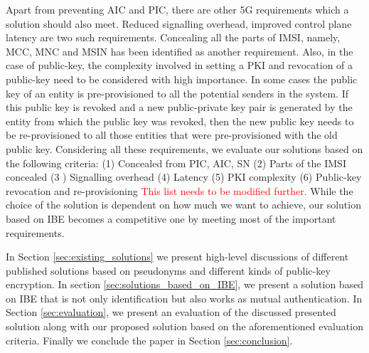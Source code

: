 \documentclass[runningheads,a4paper]{llncs} %
\begin{document}
Apart from preventing AIC and PIC, there are other 5G requirements which a solution should also meet. Reduced signalling overhead, improved control plane latency are two such requirements. Concealing all the parts of IMSI, namely, MCC, MNC and MSIN has been identified as another requirement. Also, in the case of public-key, the complexity involved in setting a PKI and revocation of a public-key need to be considered with high importance. In some cases the public key of an entity is pre-provisioned to all the potential senders in the system. If this public key is revoked and a new public-private key pair is generated by the entity from which the public key was revoked, then the new public key needs to be re-provisioned to all those entities that were pre-provisioned with the old public key. Considering all these requirements, we evaluate our solutions based on the following criteria: (1) Concealed from PIC, AIC, SN (2) Parts of the IMSI concealed (3 ) Signalling overhead (4) Latency (5) PKI complexity (6) Public-key revocation and re-provisioning 
\textcolor{red}{This list needs to be modified further.} %
While the choice of the solution is dependent on how much we want to achieve, our solution based on IBE becomes a competitive one by meeting most of the important requirements.

In Section \ref{sec:existing_solutions} we present high-level discussions of different published solutions based on pseudonyms and different kinds of public-key encryption. In section  \ref{sec:solutions_based_on_IBE}, we present a solution based on IBE that is not only identification but also works as mutual authentication. In Section \ref{sec:evaluation}, we present an evaluation of the discussed presented solution along with our proposed solution based on the aforementioned evaluation criteria. Finally we conclude the paper in Section \ref{sec:conclusion}.
\end{document}
